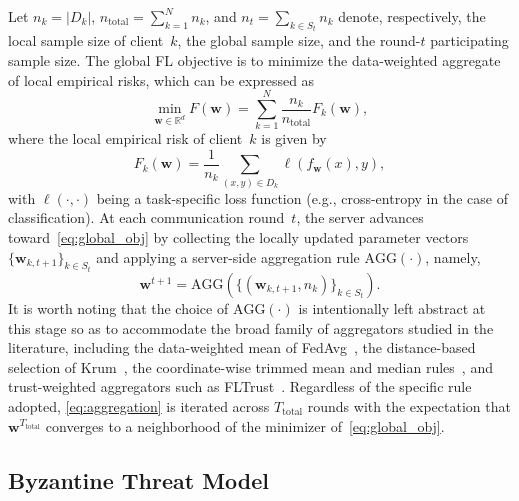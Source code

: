 \documentclass[journal]{IEEEtran}
\begin{document}
Let $n_k = |D_k|$, $n_{\text{total}} = \sum_{k=1}^{N} n_k$, and $n_t = \sum_{k \in S_t} n_k$ denote, respectively, the local sample size of client~$k$, the global sample size, and the round-$t$ participating sample size. The global FL objective is to minimize the data-weighted aggregate of local empirical risks, which can be expressed as
\begin{equation}
\min_{\mathbf{w} \in \mathbb{R}^d} F(\mathbf{w}) = \sum_{k=1}^{N} \frac{n_k}{n_{\text{total}}} F_k(\mathbf{w}),
\label{eq:global_obj}
\end{equation}
where the local empirical risk of client~$k$ is given by
\begin{equation}
F_k(\mathbf{w}) = \frac{1}{n_k} \sum_{(x,y) \in D_k} \ell(f_{\mathbf{w}}(x), y),
\label{eq:local_risk}
\end{equation}
with $\ell(\cdot, \cdot)$ being a task-specific loss function (e.g., cross-entropy in the case of classification). At each communication round~$t$, the server advances toward~\eqref{eq:global_obj} by collecting the locally updated parameter vectors $\{\mathbf{w}_{k,t+1}\}_{k \in S_t}$ and applying a server-side aggregation rule $\text{AGG}(\cdot)$, namely,
\begin{equation}
\mathbf{w}^{t+1} = \text{AGG}\left(\{(\mathbf{w}_{k,t+1}, n_k)\}_{k \in S_t}\right).
\label{eq:aggregation}
\end{equation}
It is worth noting that the choice of $\text{AGG}(\cdot)$ is intentionally left abstract at this stage so as to accommodate the broad family of aggregators studied in the literature, including the data-weighted mean of FedAvg~\cite{mcmahan2017communication}, the distance-based selection of Krum~\cite{blanchard2017machine}, the coordinate-wise trimmed mean and median rules~\cite{yin2018byzantine}, and trust-weighted aggregators such as FLTrust~\cite{cao2020fltrust}. Regardless of the specific rule adopted, \eqref{eq:aggregation} is iterated across $T_{\text{total}}$ rounds with the expectation that $\mathbf{w}^{T_{\text{total}}}$ converges to a neighborhood of the minimizer of~\eqref{eq:global_obj}.

\subsection{Byzantine Threat Model}
\label{sec:threat}
\end{document}
